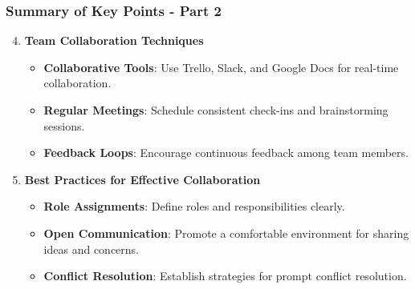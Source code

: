 \documentclass[aspectratio=169]{beamer}
\begin{document}
\begin{frame}[fragile]
    \frametitle{Summary of Key Points - Part 2}
    \begin{enumerate}
        \setcounter{enumi}{3} %
        \item \textbf{Team Collaboration Techniques}
        \begin{itemize}
            \item \textbf{Collaborative Tools}: Use Trello, Slack, and Google Docs for real-time collaboration.
            \item \textbf{Regular Meetings}: Schedule consistent check-ins and brainstorming sessions.
            \item \textbf{Feedback Loops}: Encourage continuous feedback among team members.
        \end{itemize}

        \item \textbf{Best Practices for Effective Collaboration}
        \begin{itemize}
            \item \textbf{Role Assignments}: Define roles and responsibilities clearly.
            \item \textbf{Open Communication}: Promote a comfortable environment for sharing ideas and concerns.
            \item \textbf{Conflict Resolution}: Establish strategies for prompt conflict resolution.
        \end{itemize}
    \end{enumerate}
\end{frame}
\end{document}
